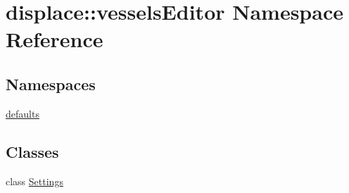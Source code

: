 \hypertarget{namespacedisplace_1_1vessels_editor}{}\section{displace\+::vessels\+Editor Namespace Reference}
\label{namespacedisplace_1_1vessels_editor}
\subsection*{Namespaces}
\begin{DoxyCompactItemize}
\item 
 \mbox{\hyperlink{namespacedisplace_1_1vessels_editor_1_1defaults}{defaults}}
\end{DoxyCompactItemize}
\subsection*{Classes}
\begin{DoxyCompactItemize}
\item 
class \mbox{\hyperlink{classdisplace_1_1vessels_editor_1_1_settings}{Settings}}
\end{DoxyCompactItemize}
